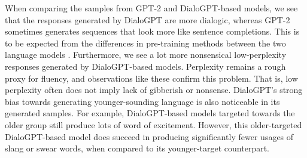 When comparing the samples from GPT-2 and DialoGPT-based models, we see that the responses generated by DialoGPT are more dialogic, whereas GPT-2 sometimes generates sequences that look more like sentence completions. This is to be expected from the differences in pre-training methods between the two language models \citep{zhang2019dialogpt}. Furthermore, we see a lot more nonsensical low-perplexity responses generated by DialoGPT-based models. Perplexity remains a rough proxy for fluency, and observations like these confirm this problem. That is, low perplexity often does not imply lack of gibberish or nonsense. DialoGPT's strong bias towards generating younger-sounding language is also noticeable in its generated samples. For example, DialoGPT-based models targeted towards the older group still produce lots of word of excitement. However, this older-targeted DialoGPT-based model does succeed in producing significantly fewer usages of slang or swear words, when compared to its younger-target counterpart.






